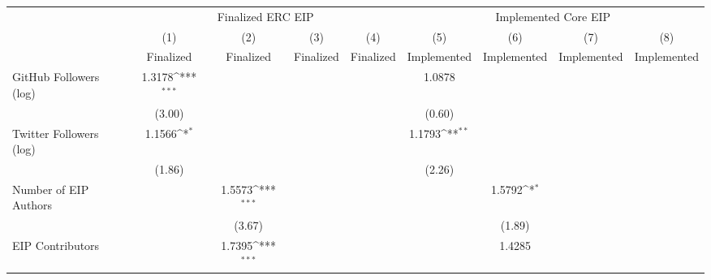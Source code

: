 {
\def\sym#1{\ifmmode^{#1}\else\(^{#1}\)\fi}
\begin{tabular}{l*{8}{c}}
\hline\hline
                                   &\multicolumn{4}{c}{Finalized ERC EIP}                                                  &\multicolumn{4}{c}{Implemented Core EIP}                                               \\\cmidrule(lr){2-5}\cmidrule(lr){6-9}
                                   &\multicolumn{1}{c}{(1)}         &\multicolumn{1}{c}{(2)}         &\multicolumn{1}{c}{(3)}         &\multicolumn{1}{c}{(4)}         &\multicolumn{1}{c}{(5)}         &\multicolumn{1}{c}{(6)}         &\multicolumn{1}{c}{(7)}         &\multicolumn{1}{c}{(8)}         \\
                                   &   Finalized         &   Finalized         &   Finalized         &   Finalized         & Implemented         & Implemented         & Implemented         & Implemented         \\
\hline
GitHub Followers (log)             &      1.3178\sym{***}&                     &                     &                     &      1.0878         &                     &                     &                     \\
                                   &      (3.00)         &                     &                     &                     &      (0.60)         &                     &                     &                     \\
[1em]
Twitter Followers (log)            &      1.1566\sym{*}  &                     &                     &                     &      1.1793\sym{**} &                     &                     &                     \\
                                   &      (1.86)         &                     &                     &                     &      (2.26)         &                     &                     &                     \\
[1em]
Number of EIP Authors              &                     &      1.5573\sym{***}&                     &                     &                     &      1.5792\sym{*}  &                     &                     \\
                                   &                     &      (3.67)         &                     &                     &                     &      (1.89)         &                     &                     \\
[1em]
EIP Contributors                   &                     &      1.7395\sym{***}&                     &                     &                     &      1.4285         &                     &                     \\

\end{tabular}}
